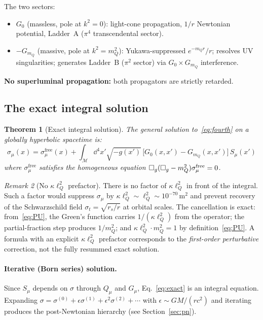 \documentclass[11pt,a4paper]{article}
\theoremstyle{plain}
\newtheorem{theorem}{Theorem}[section]
\theoremstyle{definition}
\theoremstyle{remark}
\newtheorem{remark}[theorem]{Remark}
\newcommand{\sigt}{\sigma_t}
\newcommand{\rs}{r_s}
\newcommand{\lQ}{\ell_Q}
\newcommand{\mQ}{m_Q}
\newcommand{\boxg}{\square_g}
\begin{document}
The two sectors:
\begin{itemize}[nosep]
  \item $G_0$ (massless, pole at $k^2=0$): light-cone propagation, $1/r$ Newtonian potential, Ladder~A ($\pi^4$ transcendental sector).
  \item $-G_{\mQ}$ (massive, pole at $k^2=\mQ^2$): Yukawa-suppressed $e^{-\mQ r}/r$;
    resolves UV singularities; generates Ladder~B ($\pi^2$ sector) via $G_0\times G_{\mQ}$ interference.
\end{itemize}

\textbf{No superluminal propagation:} both propagators are strictly retarded.

\subsection{The exact integral solution}

\begin{theorem}[Exact integral solution]
\label{thm:exact}
The general solution to~\eqref{eq:fourth} on a globally hyperbolic spacetime is:
\begin{equation}
  \sigma_\mu(x) = \sigma_\mu^{\mathrm{free}}(x)
    + \int_{\mathcal{M}}\!\dd^4x'\sqrt{-g(x')}\,
      \bigl[G_0(x,x') - G_{\mQ}(x,x')\bigr]\,S_\mu(x')
  \label{eq:exact}
\end{equation}
where $\sigma_\mu^{\mathrm{free}}$ satisfies the homogeneous equation
$\boxg(\boxg - \mQ^2)\sigma_\mu^{\rm free} = 0$.
\end{theorem}

\begin{remark}[No $\kappa\lQ^2$ prefactor]
There is no factor of $\kappa\lQ^2$ in front of the integral.  Such a factor would
suppress $\sigma_\mu$ by $\kappa\lQ^2\sim\lQ^2\sim 10^{-70}\,\mathrm{m}^2$ and prevent
recovery of the Schwarzschild field $\sigt = \sqrt{\rs/r}$ at orbital scales.  The
cancellation is exact: from~\eqref{eq:PU}, the Green's function carries
$1/(\kappa\lQ^2)$ from the operator; the partial-fraction step produces $1/\mQ^2$;
and $\kappa\lQ^2\cdot\mQ^2 = 1$ by definition~\eqref{eq:PU}.  A formula with an
explicit $\kappa\lQ^2$ prefactor corresponds to the \emph{first-order perturbative}
correction, not the fully resummed exact solution.
\end{remark}

\paragraph{Iterative (Born series) solution.}
Since $S_\mu$ depends on $\sigma$ through $Q_\mu$ and $G_\mu$,
Eq.~\eqref{eq:exact} is an integral equation.  Expanding
$\sigma = \sigma^{(0)} + \epsilon\sigma^{(1)} + \epsilon^2\sigma^{(2)} + \cdots$
with $\epsilon \sim GM/(rc^2)$ and iterating produces the post-Newtonian hierarchy
(see Section~\ref{sec:pn}).
\end{document}
